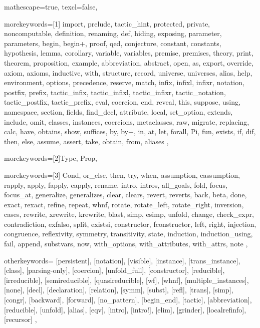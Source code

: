 
 {

mathescape=true,
texcl=false,

morekeywords=[1]{
import, prelude, tactic_hint, protected, private, noncomputable, definition, renaming, def,
hiding, exposing, parameter, parameters, begin, begin+, proof, qed, conjecture, constant, constants,
hypothesis, lemma, corollary, variable, variables, premise, premises, theory,
print, theorem, proposition, example, abbreviation, abstract,
open, as, export, override, axiom, axioms, inductive, with, structure, record, universe, universes,
alias, help, environment, options, precedence, reserve,
match, infix, infixl, infixr, notation, postfix, prefix,
tactic_infix, tactic_infixl, tactic_infixr, tactic_notation, tactic_postfix, tactic_prefix,
eval, coercion, end, reveal, this, suppose,
using, namespace, section, fields, find_decl,
attribute, local, set_option, extends, include, omit, classes,
instances, coercions, metaclasses, raw, migrate, replacing,
calc, have, obtains, show, suffices, by, by+, in, at, let, forall, Pi, fun,
exists, if, dif, then, else, assume, assert, take,
obtain, from, aliases
},

morekeywords=[2]{Type, Prop},

morekeywords=[3]{
Cond, or_else, then, try, when, assumption, eassumption, rapply,
apply, fapply, eapply, rename, intro, intros, all_goals, fold, focus, focus_at,
generalize, generalizes, clear, clears, revert, reverts, back, beta, done, exact, rexact,
refine, repeat, whnf, rotate, rotate_left, rotate_right, inversion, cases, rewrite,
xrewrite, krewrite, blast, simp, esimp, unfold, change, check_expr, contradiction,
exfalso, split, existsi, constructor, fconstructor, left, right, injection, congruence, reflexivity,
symmetry, transitivity, state, induction, induction_using, fail, append,
substvars, now, with_options, with_attributes, with_attrs, note
},

otherkeywords={
[persistent], [notation], [visible], [instance], [trans_instance],
[class], [parsing-only], [coercion], [unfold_full], [constructor],
[reducible], [irreducible], [semireducible], [quasireducible], [wf],
[whnf], [multiple_instances], [none], [decl], [declaration],
[relation], [symm], [subst], [refl], [trans], [simp], [congr],
[backward], [forward], [no_pattern], [begin_end], [tactic], [abbreviation],
[reducible], [unfold], [alias], [eqv], [intro], [intro!], [elim], [grinder],
[localrefinfo], [recursor]
},

}
